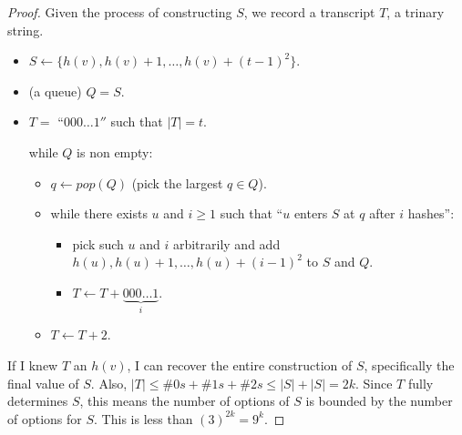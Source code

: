 \documentclass{report}
\begin{document}
\begin{proof}
    Given the process of constructing $S$, we record a transcript $T$, a trinary string.
    \begin{itemize}
        \item $S \leftarrow \{h(v), h(v) + 1, \ldots, h(v) + (t-1)^2\}$.
        \item (a queue) $Q = S$.
        \item $T = $ ``$000\ldots 1''$ such that $|T| = t$. 
        
        while $Q$ is non empty:
        \begin{itemize}
            \item $q \leftarrow pop(Q)$ (pick the largest $q \in Q$).
            \item while there exists $u$ and $i \geq 1$ such that ``$u$ enters $S$ at $q$ after $i$ hashes'':
            \begin{itemize}
                \item pick such $u$ and $i$ arbitrarily and add $h(u), h(u) + 1, \ldots, h(u) + (i-1)^2$ to $S$ and $Q$.
                \item $T \leftarrow  T + \underbrace{000\ldots 1}_{i}$.
            \end{itemize}
            \item $T \leftarrow T + 2$.
        \end{itemize}
    \end{itemize}
    If I knew $T$ an $h(v)$, I can recover the entire construction of $S$, specifically the final value of $S$. Also, $|T| \leq \# 0s + \# 1s + \# 2s \leq |S| + |S| = 2k$. 
    Since $T$ fully determines $S$, this means the number of options of $S$ is bounded by the number of options for $S$. This is less than $(3)^{2k} = 9^k$. 
\end{proof}
\end{document}
